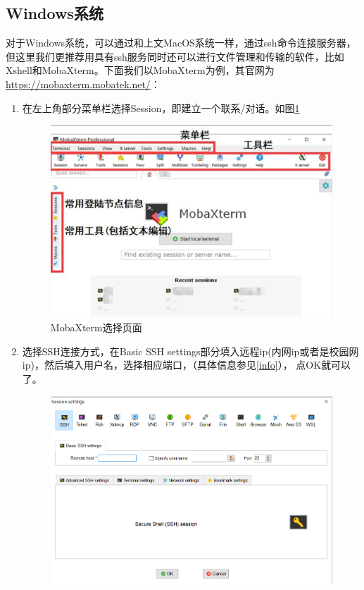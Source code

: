 \documentclass{article}
\begin{document}
\subsection{Windows系统}
对于Windows系统，可以通过和上文MacOS系统一样，通过ssh命令连接服务器，但这里我们更推荐用具有ssh服务同时还可以进行文件管理和传输的软件，比如Xshell和MobaXterm。下面我们以MobaXterm为例，其官网为\url{https://mobaxterm.mobatek.net/}：

\begin{enumerate}
    \item 在左上角部分菜单栏选择Session，即建立一个联系/对话。如图\ref{fig6}
    \begin{figure}[H]
    \centering
    \includegraphics[scale=0.3]{figs/6.png}
    \caption{MobaXterm选择页面}
    \label{fig6}
    \end{figure}
    \item 选择SSH连接方式，在Basic SSH settings部分填入远程ip(内网ip或者是校园网ip)，然后填入用户名，选择相应端口，（具体信息参见\ref{info}）， 点OK就可以了。
    \begin{figure}[H]
    \centering
    \includegraphics[scale=0.5]{figs/7.png}

\end{figure}
\end{enumerate}
\end{document}
